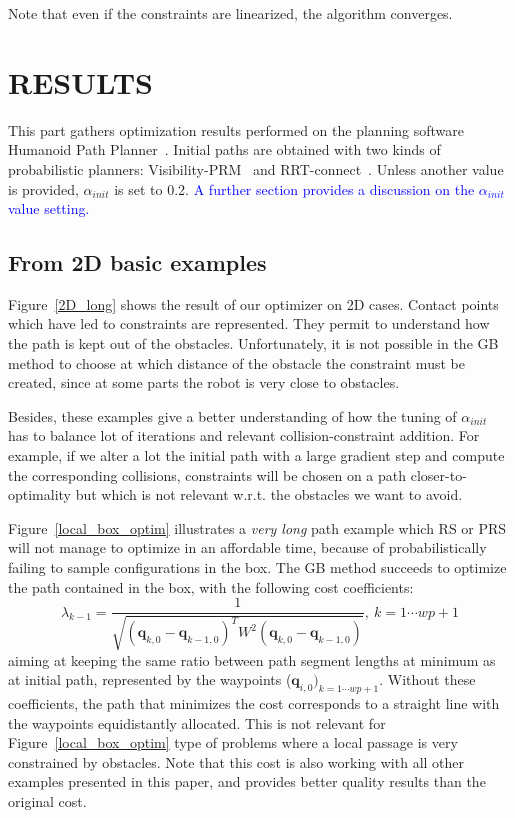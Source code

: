 \documentclass{tADR2e}
\newcommand\conf{\mathbf{q}}
\newcommand\weight{W}
\begin{document}
Note that even if the constraints are linearized, the algorithm converges.


\section{RESULTS}

This part gathers optimization results performed on the planning software 
Humanoid Path Planner~\cite{hpp}. Initial paths are obtained with two 
kinds of probabilistic planners: Visibility-PRM~\cite{visibility-prm} and 
RRT-connect~\cite{rrt-connect}. Unless another value is provided, $\alpha_{init}$ 
is set to 0.2. \textcolor{blue}{A further section provides a discussion on the $\alpha_{init}$ value setting.}

\subsection{From 2D basic examples}

Figure~\ref{2D_long} shows the result of our optimizer on 2D cases. Contact points which have 
led to constraints are represented. They permit to understand how the path is kept out of the obstacles. 
Unfortunately, it is not possible in the GB method to choose at which distance of the obstacle 
the constraint must be created, since at some parts the robot is very close to obstacles.

Besides, these examples give a better understanding of how the tuning of 
$\alpha_{init}$ 
has to balance lot of iterations and relevant collision-constraint addition. For 
example, if we alter a lot the initial path with a large gradient step and 
compute the corresponding collisions, constraints will be chosen on a 
path closer-to-optimality but which is not relevant
w.r.t. the obstacles we want to avoid.

Figure~\ref{local_box_optim} illustrates a \textit{very long} path example which RS 
or PRS will not manage to 
optimize in an affordable time, because of probabilistically failing to sample 
configurations in the box. The GB method succeeds to optimize the 
path contained in the box, with the following cost coefficients:
$$
\lambda_{k-1} = \frac{1}{\sqrt{(\conf_{k,0}-\conf_{k-1,0})^T \weight^2 
(\conf_{k,0}-\conf_{k-1,0})}}, \  k=1\cdots wp+1  
$$
aiming at keeping the same ratio between path segment lengths at 
minimum as at 
initial path, represented by the waypoints ($\conf_{i,0})_{k=1\cdots wp+1}$.
Without these coefficients, the path that minimizes the cost corresponds to a 
straight line with the waypoints equidistantly allocated. This is not relevant for 
Figure~\ref{local_box_optim} type of problems where a local passage is very
constrained by obstacles. Note that this cost is also working with all other 
examples presented in this paper, and provides better quality results than the original cost.
\end{document}
